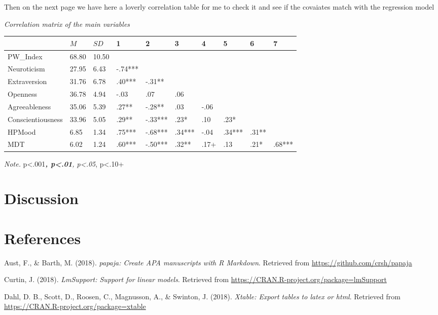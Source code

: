 \documentclass[man,floatsintext]{apa6}
\begin{document}
Then on the next page we have here a loverly correlation table for me to
check it and see if the covaiates match with the regression model

\label{tab:unnamed-chunk-2}

\emph{Correlation matrix of the main variables}

\begin{longtable}[]{@{}llllllllll@{}}
\toprule
& \(M\) & \(SD\) & 1 & 2 & 3 & 4 & 5 & 6 & 7\tabularnewline
\midrule
\endhead
PW\_Index & 68.80 & 10.50 & & & & & & &\tabularnewline
Neuroticism & 27.95 & 6.43 & -.74*** & & & & & &\tabularnewline
Extraversion & 31.76 & 6.78 & .40*** & -.31** & & & & &\tabularnewline
Openness & 36.78 & 4.94 & -.03 & .07 & .06 & & & &\tabularnewline
Agreeableness & 35.06 & 5.39 & .27** & -.28** & .03 & -.06 & &
&\tabularnewline
Conscientiousness & 33.96 & 5.05 & .29** & -.33*** & .23* & .10 & .23* &
&\tabularnewline
HPMood & 6.85 & 1.34 & .75*** & -.68*** & .34*** & -.04 & .34*** & .31**
&\tabularnewline
MDT & 6.02 & 1.24 & .60*** & -.50*** & .32** & .17+ & .13 & .21* &
.68***\tabularnewline
\bottomrule
\end{longtable}

\emph{Note.} p\textless{}.001\emph{\textbf{, p\textless{}.01},
p\textless{}.05}, p\textless{}.10+

\section{Discussion}\label{discussion}

\newpage

\section{References}\label{references}

\begingroup
\setlength{\parindent}{-0.5in} \setlength{\leftskip}{0.5in}

\hypertarget{refs}{}
\hypertarget{ref-R-papaja}{}
Aust, F., \& Barth, M. (2018). \emph{papaja: Create APA manuscripts with
R Markdown}. Retrieved from \url{https://github.com/crsh/papaja}

\hypertarget{ref-R-lmSupport}{}
Curtin, J. (2018). \emph{LmSupport: Support for linear models}.
Retrieved from \url{https://CRAN.R-project.org/package=lmSupport}

\hypertarget{ref-R-xtable}{}
Dahl, D. B., Scott, D., Roosen, C., Magnusson, A., \& Swinton, J.
(2018). \emph{Xtable: Export tables to latex or html}. Retrieved from
\url{https://CRAN.R-project.org/package=xtable}
\end{document}
